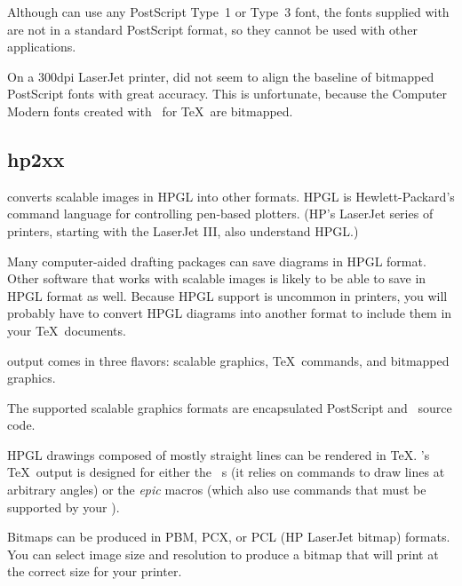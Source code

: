 Although  can use any PostScript Type~1 or Type~3
font, the fonts supplied with  are not in a standard
PostScript format, so they cannot be used with other applications.

On a 300dpi LaserJet printer,  did not seem to 
align the baseline of bitmapped PostScript fonts with great accuracy.
This is unfortunate, because the Computer Modern fonts created with
\MF\ for \TeX\ are bitmapped.  

\subsection{hp2xx}

 converts scalable 
images in HPGL into other
formats.  HPGL is Hewlett-Packard's command language for controlling
pen-based plotters.   (HP's LaserJet series of printers,
starting with the LaserJet III, also understand HPGL.)

Many computer-aided drafting packages can save diagrams in HPGL
format.  Other software that works with scalable images is
likely to be able to save in HPGL format as well.
Because HPGL support is uncommon in printers, you will probably have
to convert HPGL diagrams into another format to include
them in your \TeX\ documents.
  
 output comes in three flavors: scalable graphics,
\TeX\ commands, and bitmapped graphics. 

\begin{iplist}{.25in}

  The supported scalable graphics formats are encapsulated PostScript
  and \MF\ source code.  

\newpage

  HPGL drawings composed of mostly straight lines can be rendered in
  \TeX.  's \TeX\ output is designed for either the
  \emTeX\ \dvidriver{}s (it relies on  commands to draw
  lines at arbitrary angles) or the \textit{epic} macros (which
  also use  commands that must be supported by your
  \dvidriver).


  Bitmaps can be produced in PBM, 
  PCX, or PCL (HP 
  LaserJet bitmap)
  formats.  You can select image size and resolution to produce a
  bitmap that will print at the correct size for your printer.
\end{iplist}

